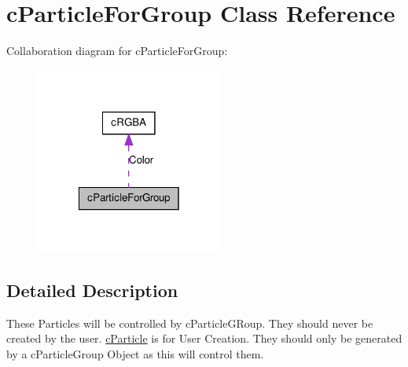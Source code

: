 \hypertarget{classc_particle_for_group}{
\section{cParticleForGroup Class Reference}
\label{classc_particle_for_group}
}


Collaboration diagram for cParticleForGroup:\nopagebreak
\begin{figure}[H]
\begin{center}
\leavevmode
\includegraphics[width=174pt]{classc_particle_for_group__coll__graph}
\end{center}
\end{figure}


\subsection{Detailed Description}
These Particles will be controlled by cParticleGRoup. They should never be created by the user. \hyperlink{classc_particle}{cParticle} is for User Creation. They should only be generated by a cParticleGroup Object as this will control them. 